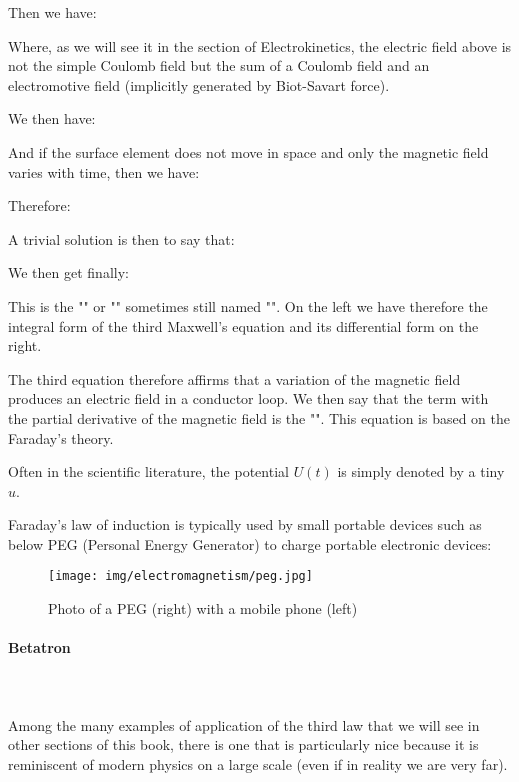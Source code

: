 	Then we have:
	
	Where, as we will see it in the section of Electrokinetics, the electric field above is not the simple Coulomb field but the sum of a Coulomb field and an electromotive field (implicitly generated by Biot-Savart force).
	
	We then have:
	
	And if the surface element does not move in space and only the magnetic field varies with time, then we have:
	
	Therefore:
	
	A trivial solution is then to say that:
	
	We then get finally:
	
	This is the "" or "" sometimes still named "". On the left we have therefore the integral form of the third Maxwell's equation and its differential form on the right.
	
	The third equation therefore affirms that a variation of the magnetic field produces an electric field in a conductor loop. We then say that the term with the partial derivative of the magnetic field is the "". This equation is based on the Faraday's theory.
	\begin{tcolorbox}[title=Remark,colframe=black,arc=10pt]
	Often in the scientific literature, the potential $U (t)$ is simply denoted by a tiny $u$.
	\end{tcolorbox}
	Faraday's law of induction is typically used by small portable devices such as below PEG (Personal Energy Generator) to charge portable electronic devices:
	\begin{figure}[H]
		\centering
		\texttt{[image: img/electromagnetism/peg.jpg]}
		\caption[Photo of a PEG with a mobile phone]{Photo of a PEG (right) with a mobile phone (left)}
	\end{figure}

	\paragraph{Betatron}\mbox{}\\\\
	Among the many examples of application of the third law that we will see in other sections of this book, there is one that is particularly nice because it is reminiscent of modern physics on a large scale (even if in reality we are very far).
	
